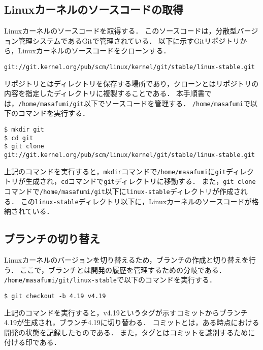 \documentclass[12pt]{jsarticle}
\begin{document}
\subsection{Linuxカーネルのソースコードの取得}
Linuxカーネルのソースコードを取得する．
このソースコードは，分散型バージョン管理システムであるGitで管理されている．
以下に示すGitリポジトリから，Linuxカーネルのソースコードをクローンする．
\begin{verbatim}
git://git.kernel.org/pub/scm/linux/kernel/git/stable/linux-stable.git
\end{verbatim}
リポジトリとはディレクトリを保存する場所であり，クローンとはリポジトリの内容を指定したディレクトリに複製することである．
本手順書では，\verb|/home/masafumi/git|以下でソースコードを管理する．
\verb|/home/masafumi|で以下のコマンドを実行する．
\begin{verbatim}
$ mkdir git
$ cd git
$ git clone git://git.kernel.org/pub/scm/linux/kernel/git/stable/linux-stable.git
\end{verbatim}
上記のコマンドを実行すると，\verb|mkdir|コマンドで\verb|/home/masafumi|に\verb|git|ディレクトリが生成され，\verb|cd|コマンドで\verb|git|ディレクトリに移動する．
また，\verb|git clone|コマンドで\verb|/home/masafumi/git|以下に\verb|linux-stable|ディレクトリが作成される．
この\verb|linux-stable|ディレクトリ以下に，Linuxカーネルのソースコードが格納されている．

\subsection{ブランチの切り替え}
Linuxカーネルのバージョンを切り替えるため，ブランチの作成と切り替えを行う．
ここで，ブランチとは開発の履歴を管理するための分岐である．
\verb|/home/masafumi/git/linux-stable|で以下のコマンドを実行する．
\begin{verbatim}
$ git checkout -b 4.19 v4.19
\end{verbatim}
上記のコマンドを実行すると，v4.19というタグが示すコミットからブランチ4.19が生成され，ブランチ4.19に切り替わる．
コミットとは，ある時点における開発の状態を記録したものである．
また，タグとはコミットを識別するために付ける印である．
\end{document}
